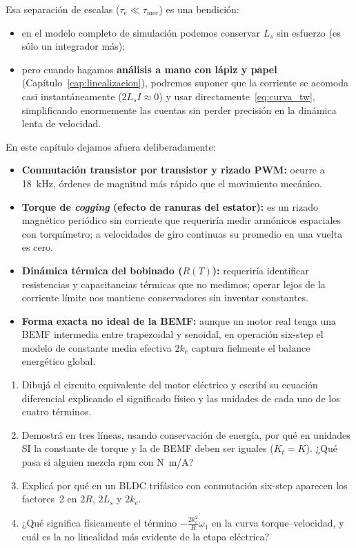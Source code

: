 \documentclass[11pt,a4paper,oneside]{book}
\begin{document}
Esa separación de escalas ($\tau_e \ll \tau_{\text{mec}}$) es una bendición:
\begin{itemize}
  \item en el modelo completo de simulación podemos conservar $L_s$ sin
        esfuerzo (es sólo un integrador más);
  \item pero cuando hagamos \textbf{análisis a mano con lápiz y papel}
        (Capítulo~\ref{cap:linealizacion}), podremos suponer que la corriente se
        acomoda casi instantáneamente ($2L_s\dot I \approx 0$) y usar
        directamente~\eqref{eq:curva_tw}, simplificando enormemente las cuentas
        sin perder precisión en la dinámica lenta de velocidad.
\end{itemize}

\begin{antidoto}
En este capítulo dejamos afuera deliberadamente:
\begin{itemize}
  \item \textbf{Conmutación transistor por transistor y rizado PWM:} ocurre a
        \SI{18}{kHz}, órdenes de magnitud más rápido que el movimiento mecánico.
  \item \textbf{Torque de \emph{cogging} (efecto de ranuras del estator):} es un
        rizado magnético periódico sin corriente que requeriría medir armónicos
        espaciales con torquímetro; a velocidades de giro continuas su promedio
        en una vuelta es cero.
  \item \textbf{Dinámica térmica del bobinado ($R(T)$):} requeriría identificar
        resistencias y capacitancias térmicas que no medimos; operar lejos de la
        corriente límite nos mantiene conservadores sin inventar constantes.
  \item \textbf{Forma exacta no ideal de la BEMF:} aunque un motor real tenga
        una BEMF intermedia entre trapezoidal y senoidal, en operación six-step
        el modelo de constante media efectiva $2k_e$ captura fielmente el balance
        energético global.
\end{itemize}
\end{antidoto}

\begin{lapizypapel}
\begin{enumerate}[leftmargin=1.5em]
  \item Dibujá el circuito equivalente del motor eléctrico y escribí su ecuación
        diferencial explicando el significado físico y las unidades de cada uno
        de los cuatro términos.
  \item Demostrá en tres líneas, usando conservación de energía, por qué en
        unidades SI la constante de torque y la de BEMF deben ser iguales
        ($K_t = K$). ¿Qué pasa si alguien mezcla rpm con \si{N.m/A}?
  \item Explicá por qué en un BLDC trifásico con conmutación six-step aparecen
        los factores~2 en $2R$, $2L_s$ y $2k_e$.
  \item ¿Qué significa físicamente el término $- \frac{2k_e^2}{R}\omega_1$ en la
        curva torque--velocidad, y cuál es la no linealidad más evidente de la
        etapa eléctrica?
\end{enumerate}
\end{lapizypapel}
\end{document}
